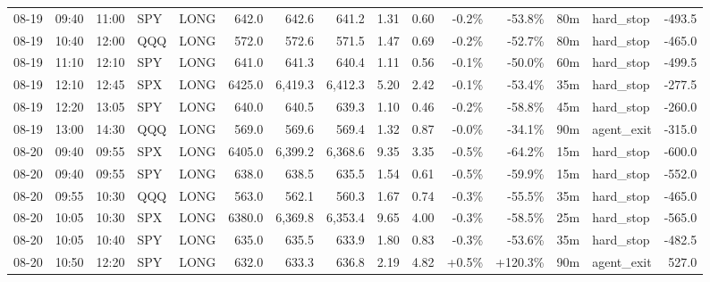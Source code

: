 \documentclass[11pt,a4paper,twoside]{article}
\begin{document}
\begin{landscape}
\begin{center}
\begin{longtable}{>{\color{txtmain}}l l l l l r r r r r r r r >{\color{txtmain}}l r}
08-19 & 09:40 & 11:00 & SPY & LONG & 642.0 & 642.6 & 641.2 & 1.31 & 0.60 & \textcolor{lossred}{-0.2\%} & \textcolor{lossred}{-53.8\%} & 80m & hard\_stop & \textcolor{lossred}{-493.5} \\
08-19 & 10:40 & 12:00 & QQQ & LONG & 572.0 & 572.6 & 571.5 & 1.47 & 0.69 & \textcolor{lossred}{-0.2\%} & \textcolor{lossred}{-52.7\%} & 80m & hard\_stop & \textcolor{lossred}{-465.0} \\
08-19 & 11:10 & 12:10 & SPY & LONG & 641.0 & 641.3 & 640.4 & 1.11 & 0.56 & \textcolor{lossred}{-0.1\%} & \textcolor{lossred}{-50.0\%} & 60m & hard\_stop & \textcolor{lossred}{-499.5} \\
08-19 & 12:10 & 12:45 & SPX & LONG & 6425.0 & 6,419.3 & 6,412.3 & 5.20 & 2.42 & \textcolor{lossred}{-0.1\%} & \textcolor{lossred}{-53.4\%} & 35m & hard\_stop & \textcolor{lossred}{-277.5} \\
08-19 & 12:20 & 13:05 & SPY & LONG & 640.0 & 640.5 & 639.3 & 1.10 & 0.46 & \textcolor{lossred}{-0.2\%} & \textcolor{lossred}{-58.8\%} & 45m & hard\_stop & \textcolor{lossred}{-260.0} \\
08-19 & 13:00 & 14:30 & QQQ & LONG & 569.0 & 569.6 & 569.4 & 1.32 & 0.87 & \textcolor{lossred}{-0.0\%} & \textcolor{lossred}{-34.1\%} & 90m & agent\_exit & \textcolor{lossred}{-315.0} \\
08-20 & 09:40 & 09:55 & SPX & LONG & 6405.0 & 6,399.2 & 6,368.6 & 9.35 & 3.35 & \textcolor{lossred}{-0.5\%} & \textcolor{lossred}{-64.2\%} & 15m & hard\_stop & \textcolor{lossred}{-600.0} \\
08-20 & 09:40 & 09:55 & SPY & LONG & 638.0 & 638.5 & 635.5 & 1.54 & 0.61 & \textcolor{lossred}{-0.5\%} & \textcolor{lossred}{-59.9\%} & 15m & hard\_stop & \textcolor{lossred}{-552.0} \\
08-20 & 09:55 & 10:30 & QQQ & LONG & 563.0 & 562.1 & 560.3 & 1.67 & 0.74 & \textcolor{lossred}{-0.3\%} & \textcolor{lossred}{-55.5\%} & 35m & hard\_stop & \textcolor{lossred}{-465.0} \\
08-20 & 10:05 & 10:30 & SPX & LONG & 6380.0 & 6,369.8 & 6,353.4 & 9.65 & 4.00 & \textcolor{lossred}{-0.3\%} & \textcolor{lossred}{-58.5\%} & 25m & hard\_stop & \textcolor{lossred}{-565.0} \\
08-20 & 10:05 & 10:40 & SPY & LONG & 635.0 & 635.5 & 633.9 & 1.80 & 0.83 & \textcolor{lossred}{-0.3\%} & \textcolor{lossred}{-53.6\%} & 35m & hard\_stop & \textcolor{lossred}{-482.5} \\
08-20 & 10:50 & 12:20 & SPY & LONG & 632.0 & 633.3 & 636.8 & 2.19 & 4.82 & \textcolor{wingreen}{+0.5\%} & \textcolor{wingreen}{+120.3\%} & 90m & agent\_exit & \textcolor{wingreen}{527.0} \\

\end{longtable}
\end{center}
\end{landscape}
\end{document}
